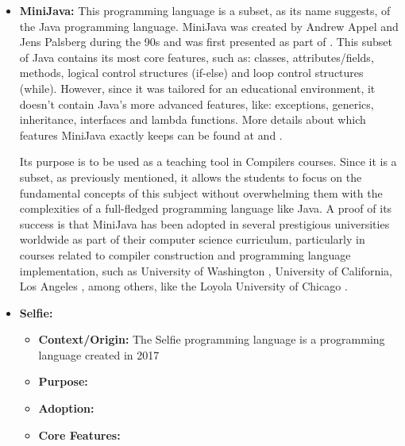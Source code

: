 \begin{itemize}
    \item \textbf{MiniJava:} This programming language \cite{cambridge_minijava_project} is a subset, as its name suggests, of the Java programming language. MiniJava was created by Andrew Appel and Jens Palsberg during the 90s and was first presented as part of \cite{appel2002modernCompilerImplementationJava}. This subset of Java contains its most core features, such as: classes, attributes/fields, methods, logical control structures (if-else) and loop control structures (while). However, since it was tailored for an educational environment, it doesn't contain Java's more advanced features, like: exceptions, generics, inheritance, interfaces and lambda functions. More details about which features MiniJava exactly keeps can be found at \cite{cambridge_minijava_project} and \cite{cambridge_minijava_grammar}.
        
    Its purpose is to be used as a teaching tool in Compilers courses. Since it is a subset, as previously mentioned, it allows the students to focus on the fundamental concepts of this subject without overwhelming them with the complexities of a full-fledged programming language like Java.
    A proof of its success is that MiniJava has been adopted in several prestigious universities worldwide as part of their computer science curriculum, particularly in courses related to compiler construction and programming language implementation, such as University of Washington \cite{university_of_washington_cs_compiler_construction_course_page_2024}, University of California, Los Angeles \cite{ucla_cs_compiler_construction_course_page_fall_2012}, among others, like the Loyola University of Chicago \cite{loyola_university_of_chicago_cs_compiler_construction_course_page_fall_2018}.     
    
    \item \textbf{Selfie:}
    \begin{itemize}
        \item \textbf{Context/Origin:} The Selfie programming language \cite{kirsch2017selfie} is a programming language created in 2017 
        \item \textbf{Purpose:}
        \item \textbf{Adoption:}
        \item \textbf{Core Features:}
    \end{itemize}
    

\end{itemize}
